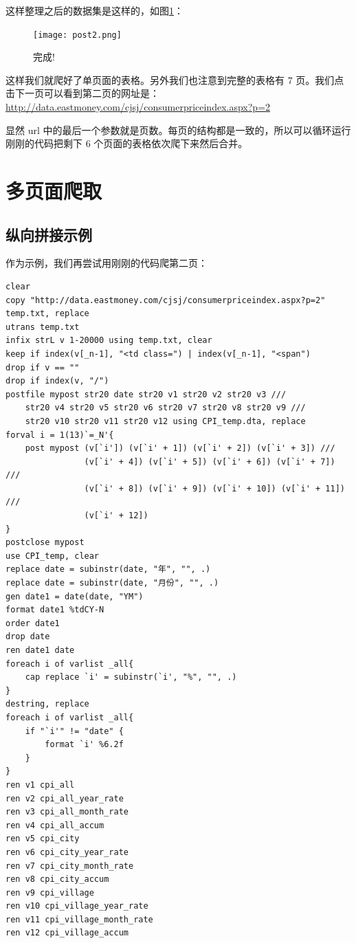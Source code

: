\documentclass[cn,fancy,blue,11pt]{elegantbook}
\begin{document}
这样整理之后的数据集是这样的，如图\ref{fig:post2}：

\begin{figure}
  \centering
  \texttt{[image: post2.png]}
  \caption{完成!}
  \label{fig:post2}
\end{figure}

这样我们就爬好了单页面的表格。另外我们也注意到完整的表格有 7 页。我们点击下一页可以看到第二页的网址是：\url{http://data.eastmoney.com/cjsj/consumerpriceindex.aspx?p=2}

显然 url 中的最后一个参数就是页数。每页的结构都是一致的，所以可以循环运行刚刚的代码把剩下 6 个页面的表格依次爬下来然后合并。

\hypertarget{section-36}{%
\section{多页面爬取}\label{section-36}}

\hypertarget{section-37}{%
\subsection{纵向拼接示例}\label{section-37}}

作为示例，我们再尝试用刚刚的代码爬第二页：

\begin{lstlisting}
clear
copy "http://data.eastmoney.com/cjsj/consumerpriceindex.aspx?p=2" temp.txt, replace
utrans temp.txt
infix strL v 1-20000 using temp.txt, clear
keep if index(v[_n-1], "<td class=") | index(v[_n-1], "<span")
drop if v == ""
drop if index(v, "/")
postfile mypost str20 date str20 v1 str20 v2 str20 v3 ///
    str20 v4 str20 v5 str20 v6 str20 v7 str20 v8 str20 v9 ///
    str20 v10 str20 v11 str20 v12 using CPI_temp.dta, replace
forval i = 1(13)`=_N'{
    post mypost (v[`i']) (v[`i' + 1]) (v[`i' + 2]) (v[`i' + 3]) ///
                (v[`i' + 4]) (v[`i' + 5]) (v[`i' + 6]) (v[`i' + 7]) ///
                (v[`i' + 8]) (v[`i' + 9]) (v[`i' + 10]) (v[`i' + 11]) ///
                (v[`i' + 12])
}
postclose mypost
use CPI_temp, clear
replace date = subinstr(date, "年", "", .)
replace date = subinstr(date, "月份", "", .)
gen date1 = date(date, "YM")
format date1 %tdCY-N
order date1
drop date
ren date1 date
foreach i of varlist _all{
    cap replace `i' = subinstr(`i', "%", "", .)
}
destring, replace
foreach i of varlist _all{
    if "`i'" != "date" {
        format `i' %6.2f
    }
}
ren v1 cpi_all
ren v2 cpi_all_year_rate
ren v3 cpi_all_month_rate
ren v4 cpi_all_accum
ren v5 cpi_city
ren v6 cpi_city_year_rate
ren v7 cpi_city_month_rate
ren v8 cpi_city_accum
ren v9 cpi_village
ren v10 cpi_village_year_rate
ren v11 cpi_village_month_rate
ren v12 cpi_village_accum
\end{lstlisting}
\end{document}
